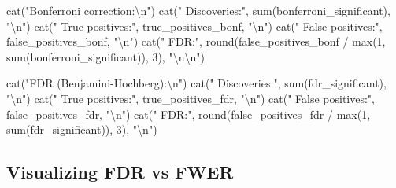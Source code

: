 \documentclass[
  11pt,
  letterpaper,
  oneside]{book}
\newenvironment{Shaded}{\begin{snugshade}}{\end{snugshade}}
\newcommand{\DecValTok}[1]{\textcolor[rgb]{0.68,0.00,0.00}{#1}}
\newcommand{\FunctionTok}[1]{\textcolor[rgb]{0.28,0.35,0.67}{#1}}
\newcommand{\NormalTok}[1]{\textcolor[rgb]{0.00,0.23,0.31}{#1}}
\newcommand{\SpecialCharTok}[1]{\textcolor[rgb]{0.37,0.37,0.37}{#1}}
\newcommand{\StringTok}[1]{\textcolor[rgb]{0.13,0.47,0.30}{#1}}
\begin{document}
\begin{Shaded}
\begin{Highlighting}[]
\FunctionTok{cat}\NormalTok{(}\StringTok{"Bonferroni correction:}\SpecialCharTok{\textbackslash{}n}\StringTok{"}\NormalTok{)}
\FunctionTok{cat}\NormalTok{(}\StringTok{"  Discoveries:"}\NormalTok{, }\FunctionTok{sum}\NormalTok{(bonferroni\_significant), }\StringTok{"}\SpecialCharTok{\textbackslash{}n}\StringTok{"}\NormalTok{)}
\FunctionTok{cat}\NormalTok{(}\StringTok{"  True positives:"}\NormalTok{, true\_positives\_bonf, }\StringTok{"}\SpecialCharTok{\textbackslash{}n}\StringTok{"}\NormalTok{)}
\FunctionTok{cat}\NormalTok{(}\StringTok{"  False positives:"}\NormalTok{, false\_positives\_bonf, }\StringTok{"}\SpecialCharTok{\textbackslash{}n}\StringTok{"}\NormalTok{)}
\FunctionTok{cat}\NormalTok{(}\StringTok{"  FDR:"}\NormalTok{, }\FunctionTok{round}\NormalTok{(false\_positives\_bonf }\SpecialCharTok{/} \FunctionTok{max}\NormalTok{(}\DecValTok{1}\NormalTok{, }\FunctionTok{sum}\NormalTok{(bonferroni\_significant)), }\DecValTok{3}\NormalTok{), }\StringTok{"}\SpecialCharTok{\textbackslash{}n\textbackslash{}n}\StringTok{"}\NormalTok{)}

\FunctionTok{cat}\NormalTok{(}\StringTok{"FDR (Benjamini{-}Hochberg):}\SpecialCharTok{\textbackslash{}n}\StringTok{"}\NormalTok{)}
\FunctionTok{cat}\NormalTok{(}\StringTok{"  Discoveries:"}\NormalTok{, }\FunctionTok{sum}\NormalTok{(fdr\_significant), }\StringTok{"}\SpecialCharTok{\textbackslash{}n}\StringTok{"}\NormalTok{)}
\FunctionTok{cat}\NormalTok{(}\StringTok{"  True positives:"}\NormalTok{, true\_positives\_fdr, }\StringTok{"}\SpecialCharTok{\textbackslash{}n}\StringTok{"}\NormalTok{)}
\FunctionTok{cat}\NormalTok{(}\StringTok{"  False positives:"}\NormalTok{, false\_positives\_fdr, }\StringTok{"}\SpecialCharTok{\textbackslash{}n}\StringTok{"}\NormalTok{)}
\FunctionTok{cat}\NormalTok{(}\StringTok{"  FDR:"}\NormalTok{, }\FunctionTok{round}\NormalTok{(false\_positives\_fdr }\SpecialCharTok{/} \FunctionTok{max}\NormalTok{(}\DecValTok{1}\NormalTok{, }\FunctionTok{sum}\NormalTok{(fdr\_significant)), }\DecValTok{3}\NormalTok{), }\StringTok{"}\SpecialCharTok{\textbackslash{}n}\StringTok{"}\NormalTok{)}
\end{Highlighting}
\end{Shaded}

\subsection{Visualizing FDR vs FWER}\label{visualizing-fdr-vs-fwer}
\end{document}
